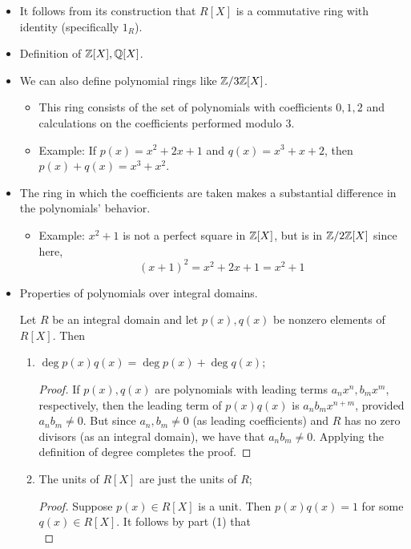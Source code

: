 \documentclass[../notes.tex]{subfiles}
\begin{document}
\begin{itemize}
    \item It follows from its construction that $R[X]$ is a commutative ring with identity (specifically $1_R$).
    \item Definition of $\mathbb{Z}[X],\mathbb{Q}[X]$.
    \item We can also define polynomial rings like $\mathbb{Z}/3\mathbb{Z}[X]$.
    \begin{itemize}
        \item This ring consists of the set of polynomials with coefficients $0,1,2$ and calculations on the coefficients performed modulo 3.
        \item Example: If $p(x)=x^2+2x+1$ and $q(x)=x^3+x+2$, then $p(x)+q(x)=x^3+x^2$.
    \end{itemize}
    \item The ring in which the coefficients are taken makes a substantial difference in the polynomials' behavior.
    \begin{itemize}
        \item Example: $x^2+1$ is not a perfect square in $\mathbb{Z}[X]$, but is in $\mathbb{Z}/2\mathbb{Z}[X]$ since here,
        \begin{equation*}
            (x+1)^2 = x^2+2x+1 = x^2+1
        \end{equation*}
    \end{itemize}
    \item Properties of polynomials over integral domains.
    \begin{proposition}\label{prp:7.4}
        Let $R$ be an integral domain and let $p(x),q(x)$ be nonzero elements of $R[X]$. Then
        \begin{enumerate}
            \item $\deg p(x)q(x)=\deg p(x)+\deg q(x)$;
            \begin{proof}
                If $p(x),q(x)$ are polynomials with leading terms $a_nx^n,b_mx^m$, respectively, then the leading term of $p(x)q(x)$ is $a_nb_mx^{n+m}$, provided $a_nb_m\neq 0$. But since $a_n,b_m\neq 0$ (as leading coefficients) and $R$ has no zero divisors (as an integral domain), we have that $a_nb_m\neq 0$. Applying the definition of degree completes the proof.
            \end{proof}
            \item The units of $R[X]$ are just the units of $R$;
            \begin{proof}
                Suppose $p(x)\in R[X]$ is a unit. Then $p(x)q(x)=1$ for some $q(x)\in R[X]$. It follows by part (1) that
                \begin{equation*}

\end{equation*}
\end{proof}
\end{enumerate}
\end{proposition}
\end{itemize}
\end{document}
